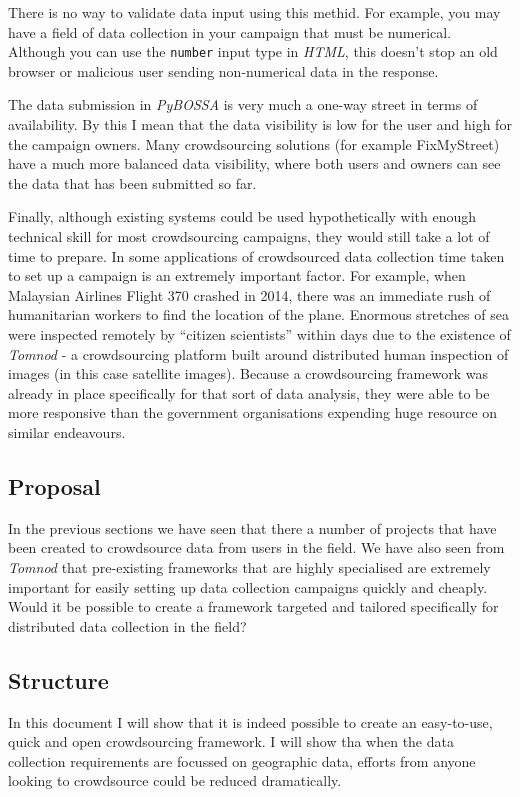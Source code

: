 \documentclass{article}
\begin{document}
		There is no way to validate data input using this methid.
		For example, you may have a field of data collection in your campaign that must be numerical.
		Although you can use the \texttt{number} input type in \textit{HTML}, this doesn't stop an old browser or malicious user sending non-numerical data in the response.

		The data submission in \textit{PyBOSSA} is very much a one-way street in terms of availability. By this I mean that the data visibility is low for the user and high for the campaign owners. Many crowdsourcing solutions (for example FixMyStreet) have a much more balanced data visibility, where both users and owners can see the data that has been submitted so far.

		Finally, although existing systems could be used hypothetically with enough technical skill for most crowdsourcing campaigns, they would still take a lot of time to prepare. In some applications of crowdsourced data collection time taken to set up a campaign is an extremely important factor. For example, when Malaysian Airlines Flight 370 crashed in 2014, there was an immediate rush of humanitarian workers to find the location of the plane. Enormous stretches of sea were inspected remotely by ``citizen scientists'' within days due to the existence of \textit{Tomnod} - a crowdsourcing platform built around distributed human inspection of images (in this case satellite images)\cite{_missing_2014}. Because a crowdsourcing framework was already in place specifically for that sort of data analysis, they were able to be more responsive than the government organisations expending huge resource on similar endeavours.

		\subsection{Proposal}
		In the previous sections we have seen that there a number of projects that have been created to crowdsource data from users in the field. We have also seen from \textit{Tomnod} that pre-existing frameworks that are highly specialised are extremely important for easily setting up data collection campaigns quickly and cheaply. Would it be possible to create a framework targeted and tailored specifically for distributed data collection in the field?

		\subsection{Structure}
		In this document I will show that it is indeed possible to create an easy-to-use, quick and open crowdsourcing framework. I will show tha when the data collection requirements are focussed on geographic data, efforts from anyone looking to crowdsource could be reduced dramatically.
\end{document}
